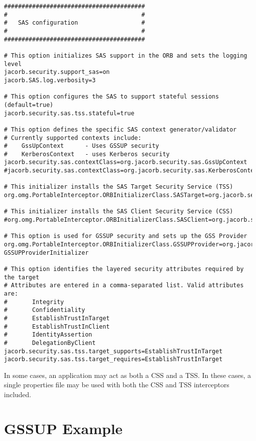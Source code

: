 \begin{scriptsize}
\begin{verbatim}
########################################
#                                      #
#   SAS configuration                  #
#                                      #
########################################

# This option initializes SAS support in the ORB and sets the logging level
jacorb.security.support_sas=on
jacorb.SAS.log.verbosity=3

# This option configures the SAS to support stateful sessions (default=true)
jacorb.security.sas.tss.stateful=true

# This option defines the specific SAS context generator/validator
# Currently supported contexts include:
#    GssUpContext      - Uses GSSUP security
#    KerberosContext   - uses Kerberos security
jacorb.security.sas.contextClass=org.jacorb.security.sas.GssUpContext
#jacorb.security.sas.contextClass=org.jacorb.security.sas.KerberosContext

# This initializer installs the SAS Target Security Service (TSS)
org.omg.PortableInterceptor.ORBInitializerClass.SASTarget=org.jacorb.security.sas.SASTargetInitializer

# This initializer installs the SAS Client Security Service (CSS)
#org.omg.PortableInterceptor.ORBInitializerClass.SASClient=org.jacorb.security.sas.SASClientInitializer

# This option is used for GSSUP security and sets up the GSS Provider
org.omg.PortableInterceptor.ORBInitializerClass.GSSUPProvider=org.jacorb.security.sas.
GSSUPProviderInitializer

# This option identifies the layered security attributes required by the target
# Attributes are entered in a comma-separated list. Valid attributes are:
#       Integrity
#       Confidentiality
#       EstablishTrustInTarget
#       EstablishTrustInClient
#       IdentityAssertion
#       DelegationByClient
jacorb.security.sas.tss.target_supports=EstablishTrustInTarget
jacorb.security.sas.tss.target_requires=EstablishTrustInTarget
\end{verbatim}
\end{scriptsize}

In some cases, an application may act as both a CSS and a TSS. 
In these cases, a single properties file may be used with both the
CSS and TSS interceptors included.

\section{GSSUP Example}

